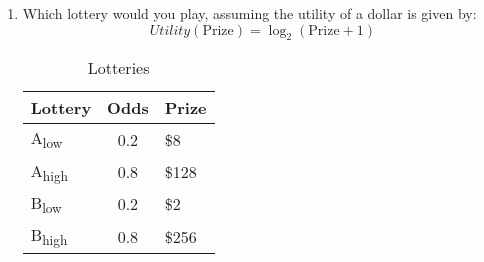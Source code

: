 \documentclass[12pt]{article}
\begin{document}
\begin{enumerate}
\item Which lottery would you play, assuming the utility of a dollar is given by:
  \begin{equation*}
    Utility(\text{Prize}) = \log_2(\text{Prize} + 1)
  \end{equation*}

  \vspace{-2em}

  \begin{table}[h!]
    \begin{center}
      \caption{Lotteries}
      \label{tab:table1}
      \begin{tabular}{l|c|l}
        \textbf{Lottery} & \textbf{Odds} & \textbf{Prize}\\
        \hline
        A\textsubscript{low}  & 0.2 & \$8\\
        A\textsubscript{high}   & 0.8 & \$128\\
        B\textsubscript{low}  & 0.2 & \$2\\
        B\textsubscript{high}  & 0.8 & \$256\\
      \end{tabular}
    \end{center}
  \end{table}

  \vspace{-2em}


\end{enumerate}
\end{document}
